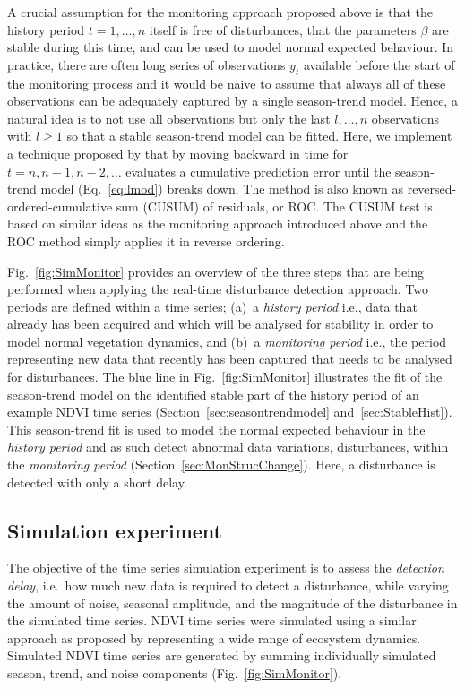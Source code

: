 \documentclass[authoryear,preprint,review,10pt]{elsarticle}
\begin{document}
A crucial assumption for the monitoring approach proposed above is that
the history period $t = 1, \dots, n$ itself is free of disturbances, that the parameters $\beta$ are stable during this time, and can be used to model normal expected behaviour. In practice, there are often long series of observations $y_t$ available
before the start of the monitoring process and it would be naive to assume
that always all of these observations can be adequately captured by a single
season-trend model. Hence, a natural idea is to not use all observations
but only the last $l, \dots, n$ observations with $l \ge 1$ so that a stable
season-trend model can be fitted. 
Here, we implement a technique proposed by \citet{Pesaran2002} that by moving backward in time for $t = n, n-1, n-2, \dots$ evaluates a cumulative prediction error until the season-trend model (Eq.~\ref{eq:lmod}) breaks down. The method is also known as reversed-ordered-cumulative sum (CUSUM) of residuals, or ROC.
The CUSUM test \citep[see][for more details]{Zeileis2002} is based on similar ideas as the monitoring approach introduced
above and the ROC method simply applies it in reverse ordering.

Fig.~\ref{fig:SimMonitor} provides an overview of the three steps that are being performed when applying the real-time disturbance detection approach. Two periods are defined within a time series; (a)~a \emph{history period} i.e., data that already has been acquired and which will be analysed for stability in order to model normal vegetation dynamics, and (b)~a \emph{monitoring period} i.e., the period representing new data that recently has been captured that needs to be analysed for disturbances. The blue line in Fig.~\ref{fig:SimMonitor} illustrates the fit of the season-trend model on the identified stable part of the history period of an example NDVI time series (Section~\ref{sec:seasontrendmodel} and~\ref{sec:StableHist}). This season-trend fit is used to model the normal expected behaviour in the \emph{history period} and as such detect abnormal data variations, disturbances, within the \emph{monitoring period}
(Section~\ref{sec:MonStrucChange}). Here, a disturbance is detected with only a short delay.

\subsection{Simulation experiment}\label{sec:Valsim}

The objective of the time series simulation experiment is to assess the \emph{detection delay}, i.e.\ how much new data is required to detect a disturbance,
while varying the amount of noise, seasonal amplitude, and the magnitude of the disturbance in the simulated time series. NDVI time series were simulated
using a similar approach as proposed by  \citet{Verbesselt:2010wo} representing a wide range of ecosystem dynamics. Simulated NDVI time series are generated by summing individually simulated season, trend, and noise components (Fig.~\ref{fig:SimMonitor}). 
\end{document}
